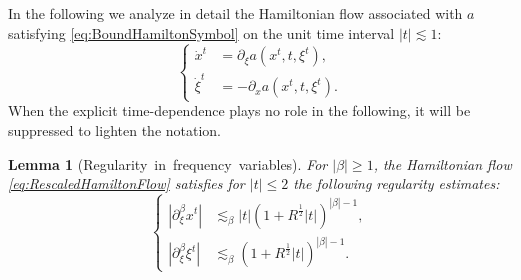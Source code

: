 \documentclass{amsart}
\newtheorem{lemma}[theorem]{Lemma}
\theoremstyle{definition}
\begin{document}
\medskip

In the following we analyze in detail the Hamiltonian flow associated with $a$ satisfying \eqref{eq:BoundHamiltonSymbol} on the unit time interval $|t| \lesssim 1$:
\begin{equation}
\label{eq:RescaledHamiltonFlow}
\left\{ \begin{array}{cl}
\dot{x}^t &= \partial_{\xi} a(x^t,t,\xi^t), \\
\dot{\xi}^t &= - \partial_x a(x^t,t,\xi^t).
\end{array} \right.
\end{equation}
When the explicit time-dependence plays no role in the following, it will be suppressed to lighten the notation.

\begin{lemma}[Regularity~in~frequency~variables]
\label{lem:HamiltonFlowFrequencyRegularity}
For $|\beta| \geq 1$, the Hamiltonian flow \eqref{eq:RescaledHamiltonFlow} satisfies for $|t| \leq 2$ the following regularity estimates:
\begin{equation}
\label{eq:RegularityHamiltonFlowFrequencies}
\left\{ \begin{array}{cl}
|\partial_{\xi}^{\beta} x^t| &\lesssim_{\beta} |t| (1+ R^{\frac{1}{2}} |t|)^{|\beta|-1}, \\
|\partial_{\xi}^{\beta} \xi^t| &\lesssim_{\beta} (1+ R^{\frac{1}{2}} |t|)^{|\beta|-1}.
\end{array} \right.
\end{equation}
\end{lemma}
\end{document}
